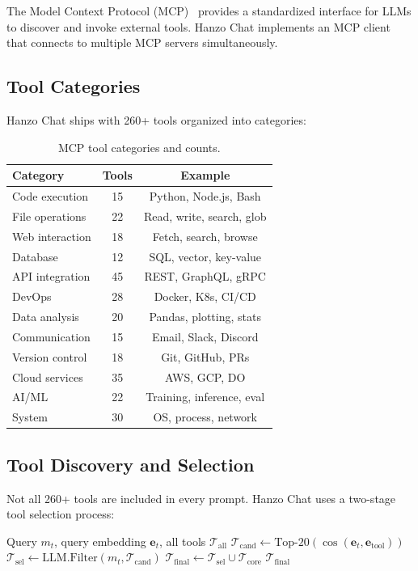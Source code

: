 \documentclass[11pt,twocolumn]{article}
\begin{document}
The Model Context Protocol (MCP)~\cite{anthropic2024mcp} provides a standardized interface for LLMs to discover and invoke external tools. Hanzo Chat implements an MCP client that connects to multiple MCP servers simultaneously.

\subsection{Tool Categories}

Hanzo Chat ships with 260+ tools organized into categories:

\begin{table}[H]
\centering
\small
\begin{tabular}{lcc}
\toprule
\textbf{Category} & \textbf{Tools} & \textbf{Example} \\
\midrule
Code execution & 15 & Python, Node.js, Bash \\
File operations & 22 & Read, write, search, glob \\
Web interaction & 18 & Fetch, search, browse \\
Database & 12 & SQL, vector, key-value \\
API integration & 45 & REST, GraphQL, gRPC \\
DevOps & 28 & Docker, K8s, CI/CD \\
Data analysis & 20 & Pandas, plotting, stats \\
Communication & 15 & Email, Slack, Discord \\
Version control & 18 & Git, GitHub, PRs \\
Cloud services & 35 & AWS, GCP, DO \\
AI/ML & 22 & Training, inference, eval \\
System & 30 & OS, process, network \\
\bottomrule
\end{tabular}
\caption{MCP tool categories and counts.}
\label{tab:tools}
\end{table}

\subsection{Tool Discovery and Selection}

Not all 260+ tools are included in every prompt. Hanzo Chat uses a two-stage tool selection process:

\begin{algorithm}[H]
\caption{Dynamic Tool Selection}
\label{alg:tools}
\begin{algorithmic}[1]
\Require Query $m_t$, query embedding $\bm{e}_t$, all tools $\mathcal{T}_{\text{all}}$
\State {}
\State $\mathcal{T}_{\text{cand}} \gets \text{Top-}20(\cos(\bm{e}_t, \bm{e}_{\text{tool}}))$
\State {}
\State $\mathcal{T}_{\text{sel}} \gets \text{LLM.Filter}(m_t, \mathcal{T}_{\text{cand}})$
\State {}
\State $\mathcal{T}_{\text{final}} \gets \mathcal{T}_{\text{sel}} \cup \mathcal{T}_{\text{core}}$
\State \Return $\mathcal{T}_{\text{final}}$ 
\end{algorithmic}
\end{algorithm}
\end{document}
